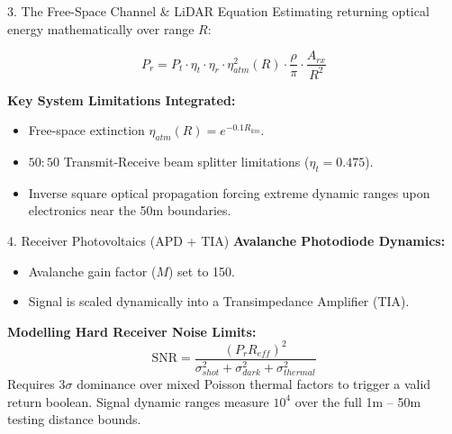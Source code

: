 \documentclass[10pt,aspectratio=169]{beamer}
\begin{document}
\begin{frame}{3. The Free-Space Channel \& LiDAR Equation}
    Estimating returning optical energy mathematically over range $R$:
    
    \begin{equation}
        P_r = P_t \cdot \eta_t \cdot \eta_r \cdot \eta_{atm}^2(R) \cdot \frac{\rho}{\pi} \cdot \frac{A_{rx}}{R^2}
    \end{equation}
    
    \vspace{3mm}
    \textbf{Key System Limitations Integrated:}
    \begin{itemize}
        \item Free-space extinction $\eta_{atm}(R) = e^{-0.1R_{km}}$.
        \item $50:50$ Transmit-Receive beam splitter limitations ($\eta_t=0.475$).
        \item Inverse square optical propagation forcing extreme dynamic ranges upon electronics near the 50m boundaries.
    \end{itemize}
\end{frame}

\begin{frame}{4. Receiver Photovoltaics (APD + TIA)}
    \textbf{Avalanche Photodiode Dynamics:}
    \begin{itemize}
        \item Avalanche gain factor ($M$) set to 150.
        \item Signal is scaled dynamically into a Transimpedance Amplifier (TIA).
    \end{itemize}
    
    \vspace{4mm}
    \textbf{Modelling Hard Receiver Noise Limits:}
    \begin{equation}
        \mathrm{SNR} = \frac{(P_r R_{eff})^2}{\sigma_{shot}^2 + \sigma_{dark}^2 + \sigma_{thermal}^2}
    \end{equation}
    Requires 3$\sigma$ dominance over mixed Poisson thermal factors to trigger a valid return boolean. Signal dynamic ranges measure $10^4$ over the full 1m -- 50m testing distance bounds.
\end{frame}
\end{document}

